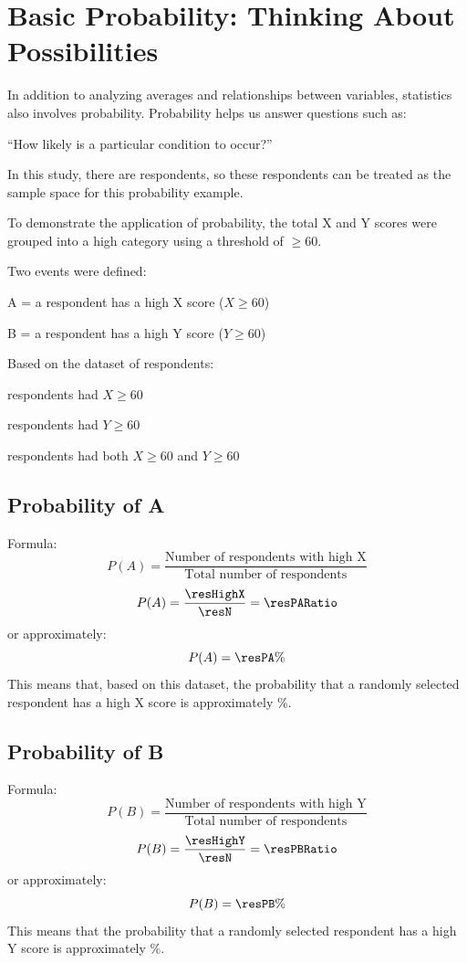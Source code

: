 \section{Basic Probability: Thinking About Possibilities}

In addition to analyzing averages and relationships between variables,
statistics also involves probability. Probability helps us answer
questions such as:

\enquote{How likely is a particular condition to occur?}

In this study, there are \resN{} respondents, so these \resN{} respondents
can be treated as the sample space for this probability example.

To demonstrate the application of probability, the total X and Y scores
were grouped into a high category using a threshold of $\ge 60$.

Two events were defined:

A = a respondent has a high X score ($X \ge 60$)

B = a respondent has a high Y score ($Y \ge 60$)

Based on the dataset of \resN{} respondents:

\resHighX{} respondents had $X \ge 60$

\resHighY{} respondents had $Y \ge 60$

\resBoth{} respondents had both $X \ge 60$ and $Y \ge 60$

\subsection{Probability of A}

Formula:
\[
P(A) = \frac{\text{Number of respondents with high X}}{\text{Total number of respondents}}
\]
\[
P(A) = \frac{\resHighX}{\resN} = \resPARatio
\]
or approximately:
\[
P(A) = \resPA\%
\]
This means that, based on this dataset, the probability that a randomly
selected respondent has a high X score is approximately \resPA\%.

\subsection{Probability of B}

Formula:
\[
P(B) = \frac{\text{Number of respondents with high Y}}{\text{Total number of respondents}}
\]
\[
P(B) = \frac{\resHighY}{\resN} = \resPBRatio
\]
or approximately:
\[
P(B) = \resPB\%
\]
This means that the probability that a randomly selected respondent has a
high Y score is approximately \resPB\%.

